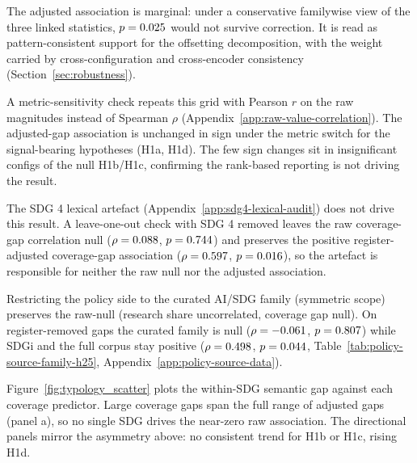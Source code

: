 \documentclass[12pt,a4paper]{article}
\begin{document}
The adjusted association is marginal: under a conservative familywise view of the three linked statistics, $p = 0.025$ would not survive correction. It is read as pattern-consistent support for the offsetting decomposition, with the weight carried by cross-configuration and cross-encoder consistency (Section~\ref{sec:robustness}).

A metric-sensitivity check repeats this grid with Pearson $r$ on the raw magnitudes instead of Spearman $\rho$ (Appendix~\ref{app:raw-value-correlation}). The adjusted-gap association is unchanged in sign under the metric switch for the signal-bearing hypotheses (H1a, H1d). The few sign changes sit in insignificant configs of the null H1b/H1c, confirming the rank-based reporting is not driving the result.

The SDG 4 lexical artefact (Appendix~\ref{app:sdg4-lexical-audit}) does not drive this result. A leave-one-out check with SDG 4 removed leaves the raw coverage-gap correlation null ($\rho = 0.088$, $p = 0.744$) and preserves the positive register-adjusted coverage-gap association ($\rho = 0.597$, $p = 0.016$), so the artefact is responsible for neither the raw null nor the adjusted association.



  Restricting the policy side to the curated AI/SDG family (symmetric scope) preserves the raw-null (research share uncorrelated, coverage gap null). On register-removed gaps the curated family is null ($\rho = -0.061$, $p = 0.807$) while SDGi and the full corpus stay positive ($\rho = 0.498$, $p = 0.044$, Table~\ref{tab:policy-source-family-h25}, Appendix~\ref{app:policy-source-data}).

Figure~\ref{fig:typology_scatter} plots the within-SDG semantic gap against each coverage predictor. Large coverage gaps span the full range of adjusted gaps (panel a), so no single SDG drives the near-zero raw association. The directional panels mirror the asymmetry above: no consistent trend for H1b or H1c, rising H1d.
\end{document}
